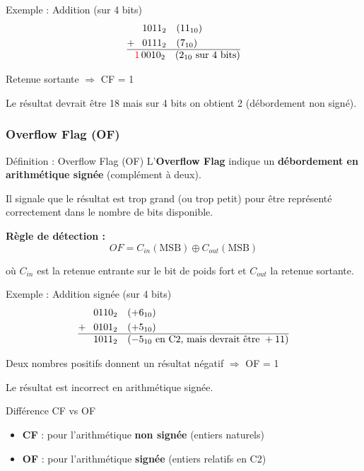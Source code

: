 \documentclass[a4paper,12pt]{article}
\begin{document}
\begin{examplebox}{Exemple : Addition (sur 4 bits)}
\begin{align*}
  &\phantom{+} 1011_2 \quad (11_{10}) \\
+ &\phantom{+} 0111_2 \quad (7_{10}) \\
\hline
&\textcolor{red}{1}\, 0010_2 \quad (2_{10} \text{ sur 4 bits})
\end{align*}

Retenue sortante $\Rightarrow$ CF = 1

Le résultat devrait être 18 mais sur 4 bits on obtient 2 (débordement non signé).
\end{examplebox}

\subsubsection{Overflow Flag (OF)}

\begin{defbox}{Définition : Overflow Flag (OF)}
L'\textbf{Overflow Flag} indique un \textbf{débordement en arithmétique signée} (complément à deux).

Il signale que le résultat est trop grand (ou trop petit) pour être représenté correctement dans le nombre de bits disponible.

\textbf{Règle de détection :}
\[OF = C_{in}(\text{MSB}) \oplus C_{out}(\text{MSB})\]

où $C_{in}$ est la retenue entrante sur le bit de poids fort et $C_{out}$ la retenue sortante.
\end{defbox}

\begin{examplebox}{Exemple : Addition signée (sur 4 bits)}
\begin{align*}
  &\phantom{+} 0110_2 \quad (+6_{10}) \\
+ &\phantom{+} 0101_2 \quad (+5_{10}) \\
\hline
&\phantom{+} 1011_2 \quad (-5_{10} \text{ en C2, mais devrait être } +11)
\end{align*}

Deux nombres positifs donnent un résultat négatif $\Rightarrow$ OF = 1

Le résultat est incorrect en arithmétique signée.
\end{examplebox}

\begin{remarkbox}{Différence CF vs OF}
\begin{itemize}
    \item \textbf{CF} : pour l'arithmétique \textbf{non signée} (entiers naturels)
    \item \textbf{OF} : pour l'arithmétique \textbf{signée} (entiers relatifs en C2)
\end{itemize}
\end{remarkbox}
\end{document}

